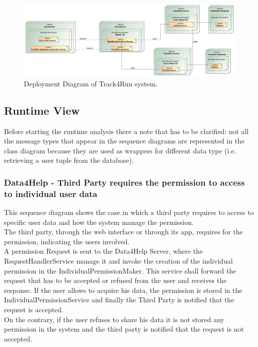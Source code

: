 \documentclass[a4paper]{article}
\begin{document}
\begin{figure}[H]
    \centering
    \includegraphics[width=\linewidth]{deploymentDiagram-Track4Run}
    \caption{Deployment Diagram of Track4Run system.}
    \label{fig:my_label}
\end{figure}
\clearpage

\subsection{Runtime View}
Before starting the runtime analysis there a note that has to be clarified: not all the message types that appear in the sequence diagrams are represented in the class diagram because they are used as wrappers for different data type (i.e. retrieving a user tuple from the database).

\subsubsection{Data4Help - Third Party requires the permission to access to individual user data}
This sequence diagram shows the case in which a third party requires to access to specific user data and how the system manage the permission. \\
The third party, through the web interface or through its app, requires for the permission, indicating the users involved.\\
A permission Request is sent to the Data4Help Server, where the RequestHandlerService manage it and invoke the creation of the individual permission in the IndividualPermissionMaker. This service shall forward the request that has to be accepted or refused from the user and receives the response. If the user allows to acquire his data, the permission is stored in the IndividualPermissionService and finally the Third Party is notified that the request is accepted.\\
On the contrary, if the user refuses to share his data it is not stored any permission in the system and the third party is notified that the request is not accepted.
\end{document}
